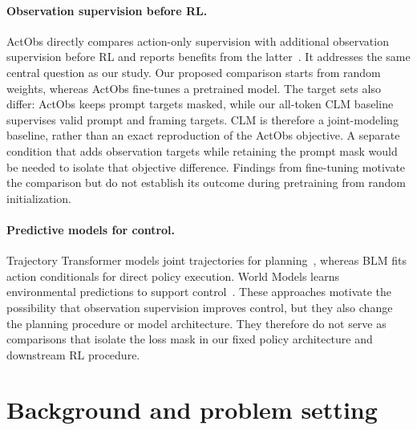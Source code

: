 \documentclass{article} %
\begin{document}
\paragraph{Observation supervision before RL.}
ActObs directly compares action-only supervision with additional observation supervision before RL and reports benefits from the latter~\citep{zhang2026dont}. It addresses the same central question as our study. Our proposed comparison starts from random weights, whereas ActObs fine-tunes a pretrained model. The target sets also differ: ActObs keeps prompt targets masked, while our all-token CLM baseline supervises valid prompt and framing targets. CLM is therefore a joint-modeling baseline, rather than an exact reproduction of the ActObs objective. A separate condition that adds observation targets while retaining the prompt mask would be needed to isolate that objective difference. Findings from fine-tuning motivate the comparison but do not establish its outcome during pretraining from random initialization.

\paragraph{Predictive models for control.}
Trajectory Transformer models joint trajectories for planning~\citep{janner2021offline}, whereas BLM fits action conditionals for direct policy execution. World Models learns environmental predictions to support control~\citep{ha2018world}. These approaches motivate the possibility that observation supervision improves control, but they also change the planning procedure or model architecture. They therefore do not serve as comparisons that isolate the loss mask in our fixed policy architecture and downstream RL procedure.

\section{Background and problem setting}
\label{sec:background}
\end{document}
